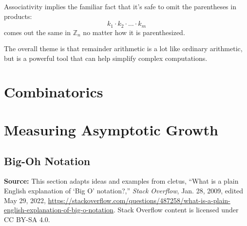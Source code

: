 \documentclass[11pt,oneside]{book}
\newcommand{\sourceattribution}[1]{%
  \begin{center}
    \small
    \textbf{Source:} #1
  \end{center}
}
\theoremstyle{definition}
\begin{document}
Associativity implies the familiar fact that it's safe to omit the parentheses in products:
\[ k_{1} \cdot k_{2} \cdot \ldots \cdot k_{m} \]
comes out the same in $\mathbb{Z}_{n}$ no matter how it is parenthesized.

The overall theme is that remainder arithmetic is a lot like ordinary arithmetic, but is a powerful tool that can help simplify complex computations.



\chapter{Combinatorics}




\chapter{Measuring Asymptotic Growth}
\section{Big-Oh Notation}
\sourceattribution{This section adapts ideas and examples from cletus, ``What is a plain English explanation of `Big O' notation?,'' \emph{Stack Overflow}, Jan. 28, 2009, edited May 29, 2022, \url{https://stackoverflow.com/questions/487258/what-is-a-plain-english-explanation-of-big-o-notation}. Stack Overflow content is licensed under CC BY-SA 4.0.}
\end{document}
